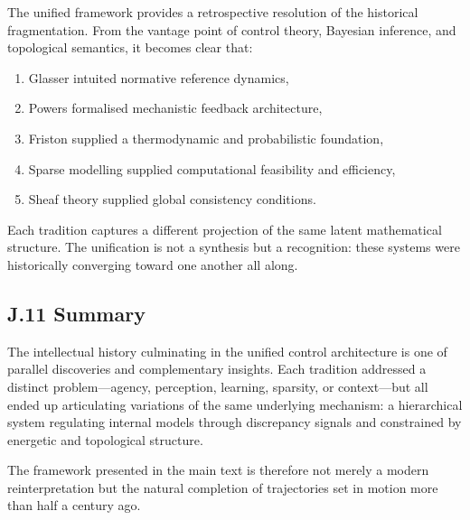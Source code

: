 \documentclass[11pt,a4paper,twoside]{article}
\begin{document}
The unified framework provides a retrospective resolution of the historical fragmentation.
From the vantage point of control theory, Bayesian inference, and topological semantics, it becomes clear that:

\begin{enumerate}
\item Glasser intuited normative reference dynamics,
\item Powers formalised mechanistic feedback architecture,
\item Friston supplied a thermodynamic and probabilistic foundation,
\item Sparse modelling supplied computational feasibility and efficiency,
\item Sheaf theory supplied global consistency conditions.
\end{enumerate}

Each tradition captures a different projection of the same latent mathematical structure.
The unification is not a synthesis but a recognition: these systems were historically converging toward one another all along.

\subsection*{J.11 Summary}

The intellectual history culminating in the unified control architecture is one of parallel discoveries and complementary insights.
Each tradition addressed a distinct problem---agency, perception, learning, sparsity, or context---but all ended up articulating variations of the same underlying mechanism: a hierarchical system regulating internal models through discrepancy signals and constrained by energetic and topological structure.

The framework presented in the main text is therefore not merely a modern reinterpretation but the natural completion of trajectories set in motion more than half a century ago.

\newpage


\printbibliography
\end{document}
